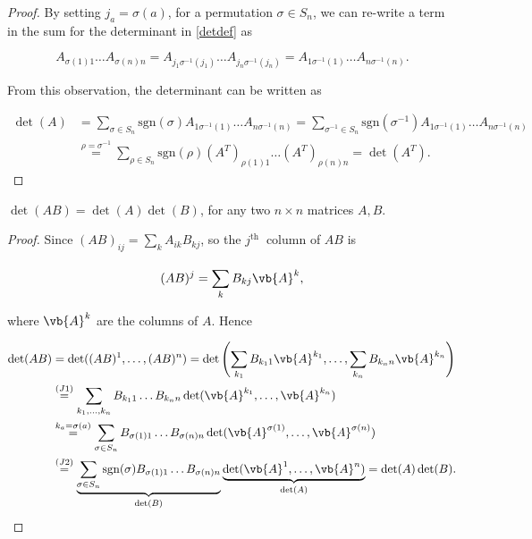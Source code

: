 \documentclass[a4paper,12pt]{report}
\begin{document}
\begin{proof}
By setting $j_a = \sigma(a)$, for a permutation $\sigma \in S_n$, we can re-write a term in the sum for the determinant in \cref{detdef} as 

\begin{equation}
A_{\sigma(1)1} \ldots A_{\sigma(n)n} = A_{j_1\sigma^{-1}(j_1)} \ldots A_{j_n\sigma^{-1}(j_n)} = A_{1\sigma^{-1}(1)} \ldots A_{n\sigma^{-1}(n)}.
\end{equation}

From this observation, the determinant can be written as

\begin{equation}
\begin{aligned}
\det(A) &= \sum_{\sigma \in S_n} \text{sgn}(\sigma) A_{1\sigma^{-1}(1)} \ldots A_{n\sigma^{-1}(n)} = \sum_{\sigma^{-1} \in S_n} \text{sgn}(\sigma^{-1}) A_{1\sigma^{-1}(1)} \ldots A_{n\sigma^{-1}(n)} \\
&\overset{\rho = \sigma^{-1}}{=} \sum_{\rho \in S_n} \text{sgn}(\rho) (A^T)_{\rho(1)1} \ldots (A^T)_{\rho(n)n} = \det(A^T).
\end{aligned}
\end{equation}
\end{proof}

\begin{theorem}
\(\det (AB) = \det (A) \det (B)\), for any two \(n \times  n\) matrices \(A, B\).   
\end{theorem}

\begin{proof}
Since \((AB)_{ij} = \sum_{k}^{} A_{ik}B_{kj}   \), so the \(j^{\text{th }} \) column of \(AB\) is 

\begin{equation}
    (AB)^{j} = \sum_{k}^{} B_{kj}\vb{A} ^{k},
\end{equation}

where \(\vb{A} ^{k} \) are the columns of \(A\). Hence

\begin{equation}
    \begin{aligned}
    \det(AB) &= \det((AB)^1, \ldots, (AB)^n) = \det\left(\sum_{k_1} B_{k_1 1} \vb{A} ^{k_1}, \ldots, \sum_{k_n} B_{k_n n} \vb{A} ^{k_n}\right) \\
    &\overset{(J1)}{=} \sum_{k_1, \ldots, k_n} B_{k_1 1} \ldots B_{k_n n} \det(\vb{A} ^{k_1}, \ldots, \vb{A} ^{k_n}) \\
    &\overset{k_a = \sigma(a)}{=} \sum_{\sigma \in S_n} B_{\sigma(1)1} \ldots B_{\sigma(n)n} \det(\vb{A} ^{\sigma(1)}, \ldots, \vb{A} ^{\sigma(n)}) \\
    &\overset{(J2)}{=} \underbrace{\sum_{\sigma \in S_n} \operatorname{sgn}(\sigma) B_{\sigma(1)1} \ldots B_{\sigma(n)n}}_{\det (B)} \underbrace{\det(\vb{A} ^1, \ldots, \vb{A} ^n)}_{\det(A)} = \det(A) \det(B).
    \end{aligned}
\end{equation}
\end{proof}
\end{document}
